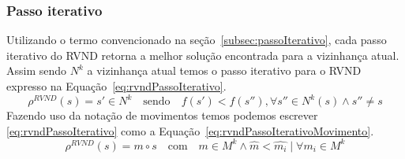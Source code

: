 \subsubsection{Passo iterativo}

Utilizando o termo convencionado na seção~\ref{subsec:passoIterativo}, cada passo iterativo do RVND retorna a melhor solução encontrada para a vizinhança atual.
Assim sendo $N^k$ a vizinhança atual temos o passo iterativo para o RVND expresso na Equação~\ref{eq:rvndPassoIterativo}.
\begin{equation} \label{eq:rvndPassoIterativo}
    \rho^{RVND}(s) = s' \in N^k \quad \textrm{sendo} \quad f(s') < f(s''), \forall s'' \in N^k(s) \land s'' \ne s
\end{equation}
Fazendo uso da notação de movimentos temos podemos escrever \ref{eq:rvndPassoIterativo} como a Equação~\ref{eq:rvndPassoIterativoMovimento}.
\begin{equation} \label{eq:rvndPassoIterativoMovimento}
    \rho^{RVND}(s) = m \circ s \quad \textrm{com} \quad m \in M^k \land \widehat{m} < \widehat{m_i} \mid \forall m_i \in M^k
\end{equation}
